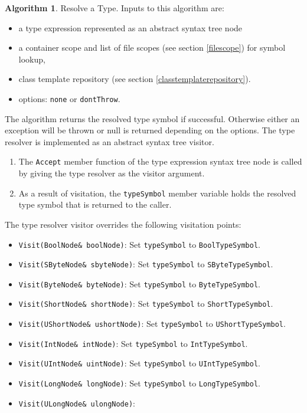 \documentclass[a4paper,oneside,11pt]{book}
\theoremstyle{definition}
\newtheorem{algo}{Algorithm}[section]
\begin{document}
\begin{algo}\label{resolvetype} Resolve a Type. Inputs to this algorithm are:
\begin{itemize}
\item
a type expression represented as an abstract syntax tree node
\item
a container scope and list of file scopes (see section \ref{filescope}) for symbol lookup,
\item
class template repository (see section \ref{classtemplaterepository}).
\item
options: \verb|none| or \verb|dontThrow|.
\end{itemize}
The algorithm returns the resolved type symbol if successful. Otherwise either an exception will be thrown or null is returned depending on the options.
The type resolver is implemented as an abstract syntax tree visitor.
\begin{enumerate}
\item
The \verb|Accept| member function of the type expression syntax tree node is called by giving the type resolver as the visitor argument.
\item
As a result of visitation, the \verb|typeSymbol| member variable holds the resolved type symbol that is returned to the caller.
\end{enumerate}
The type resolver visitor overrides the following visitation points:
\begin{itemize}
\item
\verb|Visit(BoolNode& boolNode)|:
Set \verb|typeSymbol| to \verb|BoolTypeSymbol|.
\item
\verb|Visit(SByteNode& sbyteNode)|:
Set \verb|typeSymbol| to \verb|SByteTypeSymbol|.
\item
\verb|Visit(ByteNode& byteNode)|:
Set \verb|typeSymbol| to \verb|ByteTypeSymbol|.
\item
\verb|Visit(ShortNode& shortNode)|:
Set \verb|typeSymbol| to \verb|ShortTypeSymbol|.
\item
\verb|Visit(UShortNode& ushortNode)|:
Set \verb|typeSymbol| to \verb|UShortTypeSymbol|.
\item
\verb|Visit(IntNode& intNode)|:
Set \verb|typeSymbol| to \verb|IntTypeSymbol|.
\item
\verb|Visit(UIntNode& uintNode)|:
Set \verb|typeSymbol| to \verb|UIntTypeSymbol|.
\item
\verb|Visit(LongNode& longNode)|:
Set \verb|typeSymbol| to \verb|LongTypeSymbol|.
\item
\verb|Visit(ULongNode& ulongNode)|:

\end{itemize}
\end{algo}
\end{document}

